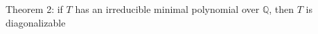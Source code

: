 \documentclass[preview]{standalone}
\begin{document}
\begin{center}
Theorem 2: if $T$ has an irreducible minimal polynomial over $\mathbb{Q}$, then $T$ is diagonalizable
\end{center}
\end{document}
